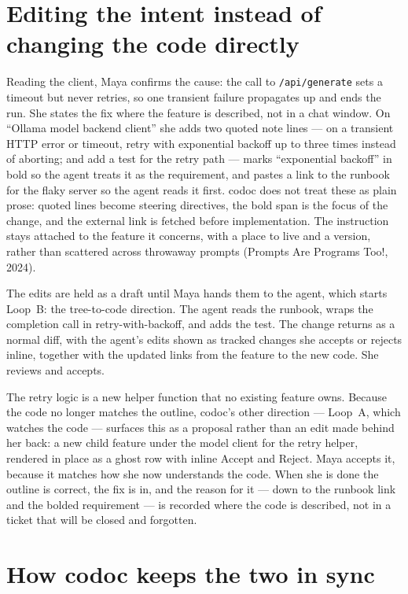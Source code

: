 \documentclass[sigconf,nonacm]{acmart}
\begin{document}
\section{Editing the intent instead of changing the code directly}

Reading the client, Maya confirms the cause: the call to \texttt{/api/generate}
sets a timeout but never retries, so one transient failure propagates up and ends
the run. She states the fix where the feature is described, not in a chat window.
On ``Ollama model backend client'' she adds two quoted note lines --- on a
transient HTTP error or timeout, retry with exponential backoff up to three times
instead of aborting; and add a test for the retry path --- marks ``exponential
backoff'' in bold so the agent treats it as the requirement, and pastes a link to
the runbook for the flaky server so the agent reads it first. codoc does not treat
these as plain prose: quoted lines become steering directives, the bold span is
the focus of the change, and the external link is fetched before implementation.
The instruction stays attached to the feature it concerns, with a place to live
and a version, rather than scattered across throwaway prompts (Prompts Are
Programs Too!, 2024).

The edits are held as a draft until Maya hands them to the agent, which starts
Loop~B: the tree-to-code direction. The agent reads the runbook, wraps the
completion call in retry-with-backoff, and adds the test. The change returns as a
normal diff, with the agent's edits shown as tracked changes she accepts or
rejects inline, together with the updated links from the feature to the new code.
She reviews and accepts.

The retry logic is a new helper function that no existing feature owns. Because
the code no longer matches the outline, codoc's other direction --- Loop~A, which
watches the code --- surfaces this as a proposal rather than an edit made behind
her back: a new child feature under the model client for the retry helper,
rendered in place as a ghost row with inline Accept and Reject. Maya accepts it,
because it matches how she now understands the code. When she is done the outline
is correct, the fix is in, and the reason for it --- down to the runbook link and
the bolded requirement --- is recorded where the code is described, not in a
ticket that will be closed and forgotten.

\section{How codoc keeps the two in sync}
\end{document}
